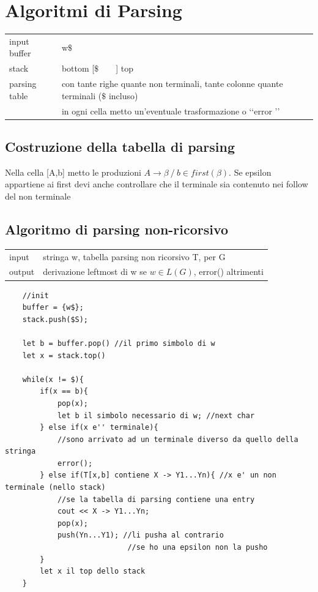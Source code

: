 \section{Algoritmi di Parsing}
\begin{center}
    \begin{tabular}{ll}
        input buffer    &   w$\$$   \\
        stack           &   bottom [$ \$ \qquad $] top \\
        parsing table   &   con tante righe quante non terminali, tante colonne quante terminali ($ \$ $ incluso)\\
                        &   in ogni cella metto un'eventuale trasformazione o \lq\lq error \rq\rq \\
    \end{tabular}
\end{center}
\subsection{Costruzione della tabella di parsing}
    Nella cella [A,b] metto le produzioni $A \rightarrow \beta \ / \ b \in first(\beta)$.
    Se epsilon appartiene ai first devi anche controllare che il terminale sia contenuto nei follow del non terminale

\subsection{Algoritmo di parsing non-ricorsivo}
\begin{center}
    \begin{tabular}{ll}
        input   &   stringa w, tabella parsing non ricorsivo T, per G\\
        output  &   derivazione leftmost di w se $w \in L(G)$, error() altrimenti\\
    \end{tabular}
\end{center}

\begin{lstlisting}
    //init
    buffer = {w$};
    stack.push($S);

    let b = buffer.pop() //il primo simbolo di w 
    let x = stack.top()  

    while(x != $){
        if(x == b){
            pop(x);
            let b il simbolo necessario di w; //next char
        } else if(x e'' terminale){ 
            //sono arrivato ad un terminale diverso da quello della stringa
            error();
        } else if(T[x,b] contiene X -> Y1...Yn){ //x e' un non terminale (nello stack)
            //se la tabella di parsing contiene una entry 
            cout << X -> Y1...Yn;
            pop(x);
            push(Yn...Y1); //li pusha al contrario
                            //se ho una epsilon non la pusho
        }
        let x il top dello stack
    }
\end{lstlisting}

